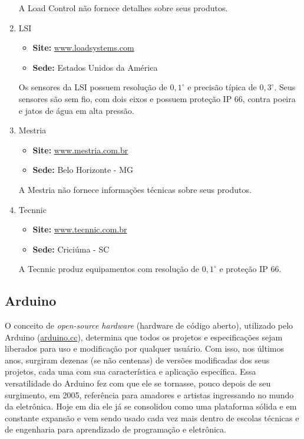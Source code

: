 \documentclass[a4paper,12pt]{article}
\newcommand{\site}[1]{\href{#1}{#1}}
\begin{document}
\begin{enumerate}
A Load Control não fornece detalhes sobre seus produtos.

\item LSI

\begin{itemize}
\item \textbf{Site:} \site{www.loadsystems.com}
\item \textbf{Sede:} Estados Unidos da América
\end{itemize}

Os sensores da LSI possuem resolução de $0,1^\circ$ e precisão típica de $0,3^\circ$. Seus sensores são sem fio, com dois eixos e possuem proteção IP 66, contra poeira e jatos de água em alta pressão.

\item Mestria

\begin{itemize}
\item \textbf{Site:} \site{www.mestria.com.br}
\item \textbf{Sede:} Belo Horizonte - MG
\end{itemize}

A Mestria não fornece informações técnicas sobre seus produtos.

\item Tecnnic

\begin{itemize}
\item \textbf{Site:} \site{www.tecnnic.com.br}
\item \textbf{Sede:} Criciúma - SC
\end{itemize}

A Tecnnic produz equipamentos com resolução de $0,1^\circ$ e proteção IP 66.

\end{enumerate}

\subsection{Arduino}
\label{arduino}

 O conceito de \textit{open-source hardware} (hardware de código aberto), utilizado pelo Arduino (\href{http://arduino.cc}{arduino.cc}), determina que todos os projetos e especificações sejam liberados para uso e modificação por qualquer usuário. Com isso, nos últimos anos, surgiram dezenas (se não centenas) de versões modificadas dos seus projetos, cada uma com sua característica e aplicação específica. Essa versatilidade do Arduino fez com que ele se tornasse, pouco depois de seu surgimento, em 2005, referência para amadores e artistas ingressando no mundo da eletrônica. Hoje em dia ele já se consolidou como uma plataforma sólida e em constante expansão e vem sendo usado cada vez mais dentro de escolas técnicas e de engenharia para aprendizado de programação e eletrônica.
 
\end{document}
